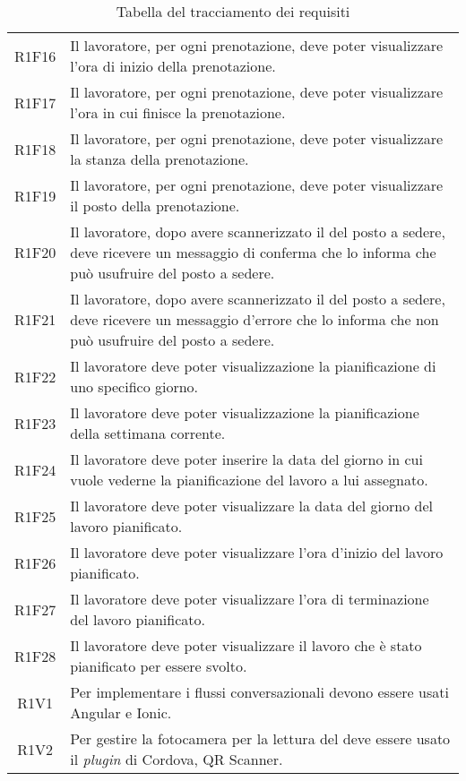 \begin{table}[h]%
		\renewcommand{\arraystretch}{1.5}
	\centering
	\begin{tabularx}{\textwidth}{c X}
		\hline		
		\rowcolor{heavenly}
		\intest{Codice} &  \intest{Descrizione} \\	
		\hline
		R1F16 & Il lavoratore, per ogni prenotazione, deve poter visualizzare l'ora di inizio della prenotazione.\\
		R1F17 & Il lavoratore, per ogni prenotazione, deve poter visualizzare l'ora in cui finisce la prenotazione.\\		
		R1F18 & Il lavoratore, per ogni prenotazione, deve poter visualizzare la stanza della prenotazione.\\
		R1F19 & Il lavoratore, per ogni prenotazione, deve poter visualizzare il posto della prenotazione.\\	
		R1F20 & Il lavoratore, dopo avere scannerizzato il \g{QR code} del posto a sedere, deve ricevere un messaggio di conferma che lo informa che può usufruire del posto a sedere.\\
		R1F21 & Il lavoratore, dopo avere scannerizzato il \g{QR code} del posto a sedere, deve ricevere un messaggio d'errore che lo informa che non può usufruire del posto a sedere.\\
		R1F22 & Il lavoratore deve poter visualizzazione la pianificazione di uno specifico giorno.\\
		R1F23 & Il lavoratore deve poter visualizzazione la pianificazione della settimana corrente.\\
		R1F24 & Il lavoratore deve poter inserire la data del giorno in cui vuole vederne la pianificazione del lavoro a lui assegnato.\\
		R1F25 & Il lavoratore deve poter visualizzare la data del giorno del lavoro pianificato.\\
		R1F26 & Il lavoratore deve poter visualizzare l'ora d'inizio del lavoro pianificato.\\
		R1F27 & Il lavoratore deve poter visualizzare l'ora di terminazione del lavoro pianificato.\\
		R1F28 & Il lavoratore deve poter visualizzare il lavoro che è stato pianificato per essere svolto.\\
		R1V1 & Per implementare i flussi conversazionali devono essere usati Angular e Ionic.\\
		R1V2 & Per gestire la fotocamera per la lettura del \g{QR code} deve essere usato il \emph{plugin} di Cordova, QR Scanner.\\
		\hline	
	\end{tabularx} \hbox{}
	\caption{Tabella del tracciamento dei requisiti}
\end{table}%
\clearpage
